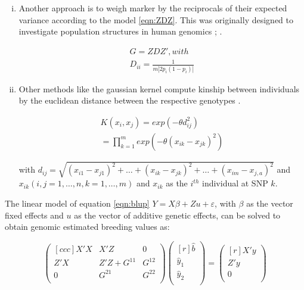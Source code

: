 \begin{enumerate}[(i)]
\item Another approach is to weigh marker by the reciprocals of their expected variance
  according to the model \ref{eqn:ZDZ}. This was originally designed to investigate
  population structures in human genomics \cite{leutenegger2003estimation};
  \cite{amin2007genomic}.

\begin{equation}
 \!\begin{aligned}
  G = ZDZ' , with \\
  D_{ii} = \frac{1}{m | 2p_i(1-p_i) | }
 \end{aligned}
 \label{eqn:ZDZ}
\end{equation}

\item Other methods like the gaussian kernel compute kinship between individuals by the euclidean distance
between the respective genotypes \cite{morota2014kernel}.

\begin{equation}
 \!\begin{aligned}
  K(x_i,x_j) = exp (- \theta d_{ij}^2) \\
  = \prod_{k=1}^m exp (- \theta(x_{ik} - x_{jk})^2)
 \end{aligned}
 \label{eqn:gauss}
\end{equation}

with
$d_{ij} = \sqrt{(x_{i1} - x_{j1})^2 + \dots + (x_{ik} - x_{jk})^2 + \dots + (x_{im} - x_{j,a})^2 }$
and
$ x_{ik}(i,j = 1, \dots , n,k = 1, \dots , m)$ and $x_{ik}$ as the $i^{th}$ individual at SNP $k$. \\
\end{enumerate}

The linear model of equation \ref{eqn:blup} $Y = X \beta + Zu + \varepsilon$, with $\beta$
as the vector fixed effects and $u$ as the vector of additive genetic effects, can be
solved to obtain genomic estimated breeding values as:

\begin{equation}
 \begin{pmatrix}[ccc]
  X'X & X'Z & 0 \\ 
  Z'X & Z'Z + G^{11} & G^{12} \\ 
  0 & G^{21} & G^{22} \\ 
 \end{pmatrix}
 \begin{pmatrix}[r]
  \hat{b} \\ 
  \hat{y}_1 \\ 
  \hat{y}_2 \\ 
 \end{pmatrix}
 =
 \begin{pmatrix}[r]
  X'y \\ 
  Z'y \\ 
  0 \\ 
 \end{pmatrix}
 \label{eqn:pBLUP}
\end{equation}

